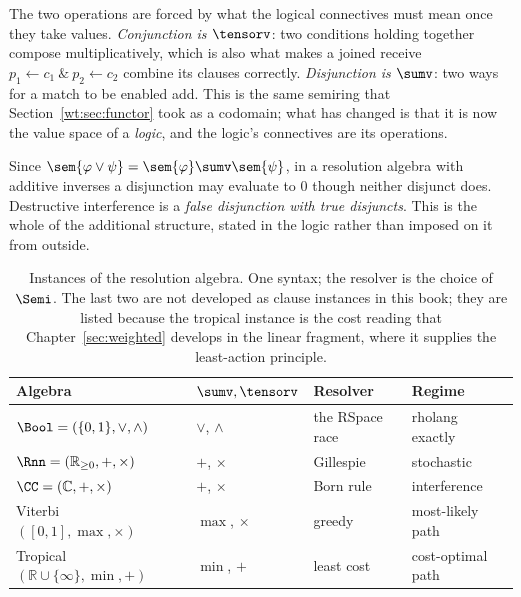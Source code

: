 The two operations are forced by what the logical connectives must mean once they take
values. \emph{Conjunction is $\tensorv$}: two conditions holding together compose
multiplicatively, which is also what makes a joined receive
$p_1 \leftarrow c_1 \ \&\ p_2 \leftarrow c_2$ combine its clauses correctly.
\emph{Disjunction is $\sumv$}: two ways for a match to be enabled add. This is the same
semiring that Section~\ref{wt:sec:functor} took as a codomain; what has changed is that
it is now the value space of a \emph{logic}, and the logic's connectives are its
operations.

\begin{principle}
\label{gw:prin:or}
Since $\sem{\varphi \vee \psi} = \sem{\varphi} \sumv \sem{\psi}$, in a resolution
algebra with additive inverses a disjunction may evaluate to $0$ though neither
disjunct does. Destructive interference is a \emph{false disjunction with true
disjuncts}. This is the whole of the additional structure, stated in the logic rather
than imposed on it from outside.
\end{principle}

\begin{table}[t]
\centering
\small
\begin{tabular}{@{}llll@{}}
\toprule
\textbf{Algebra} & $\sumv,\tensorv$ & \textbf{Resolver} & \textbf{Regime}\\
\midrule
$\Bool = (\{0,1\},\vee,\wedge)$ & $\vee$, $\wedge$ & the RSpace race & rholang exactly \\
$\Rnn = (\mathbb{R}_{\geq 0},+,\times)$ & $+$, $\times$ & Gillespie & stochastic \\
$\CC = (\mathbb{C},+,\times)$ & $+$, $\times$ & Born rule & interference \\
Viterbi $([0,1],\max,\times)$ & $\max$, $\times$ & greedy & most-likely path \\
Tropical $(\mathbb{R}\cup\{\infty\},\min,+)$ & $\min$, $+$ & least cost & cost-optimal path \\
\bottomrule
\end{tabular}
\caption{Instances of the resolution algebra. One syntax; the resolver is the choice of
$\Semi$. The last two are not developed as clause instances in this book; they are
listed because the tropical instance is the cost reading that Chapter~\ref{sec:weighted}
develops in the linear fragment, where it supplies the least-action principle.}
\label{gw:tab:algebras}
\end{table}

